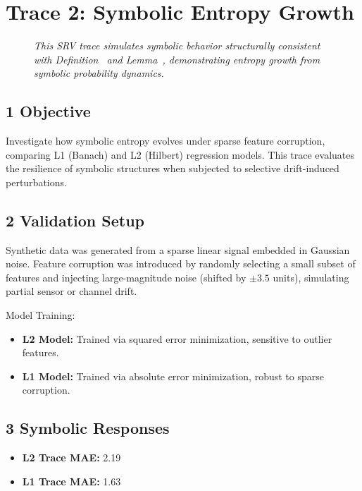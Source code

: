 \section*{Trace 2: Symbolic Entropy Growth}
\label{section:trace2_symbolic_entropy_growth}

\begin{figure}[htbp]
\centering
\caption[\textit{SRV trace (summary)}]{\textit{This SRV trace simulates symbolic behavior structurally consistent with Definition~ and Lemma~, demonstrating entropy growth from symbolic probability dynamics.}}
\label{figure:trace2_entropy_growth_summary}
\end{figure}

\subsection*{1 Objective}
\label{subsection:trace2_objective}

Investigate how symbolic entropy evolves under sparse feature corruption, comparing L1 (Banach) and L2 (Hilbert) regression models. This trace evaluates the resilience of symbolic structures when subjected to selective drift-induced perturbations.

\subsection*{2 Validation Setup}
\label{subsection:trace2_validation_setup}

Synthetic data was generated from a sparse linear signal embedded in Gaussian noise. Feature corruption was introduced by randomly selecting a small subset of features and injecting large-magnitude noise (shifted by $\pm 3.5$ units), simulating partial sensor or channel drift.

Model Training:
\begin{itemize}
    \item \textbf{L2 Model:} Trained via squared error minimization, sensitive to outlier features.
    \item \textbf{L1 Model:} Trained via absolute error minimization, robust to sparse corruption.
\end{itemize}

\subsection*{3 Symbolic Responses}
\label{subsection:trace2_symbolic_responses}

\begin{itemize}
    \item \textbf{L2 Trace MAE:} 2.19
    \item \textbf{L1 Trace MAE:} 1.63
\end{itemize}

